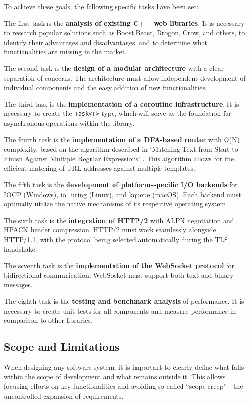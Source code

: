 To achieve these goals, the following specific tasks have been set:

The first task is the \textbf{analysis of existing C++ web libraries}. It is necessary to research popular solutions such as Boost.Beast, Drogon, Crow, and others, to identify their advantages and disadvantages, and to determine what functionalities are missing in the market.

The second task is the \textbf{design of a modular architecture} with a clear separation of concerns. The architecture must allow independent development of individual components and the easy addition of new functionalities.

The third task is the \textbf{implementation of a coroutine infrastructure}. It is necessary to create the \texttt{Task<T>} type, which will serve as the foundation for asynchronous operations within the library.

The fourth task is the \textbf{implementation of a DFA-based router} with O(N) complexity, based on the algorithm described in `Matching Text from Start to Finish Against Multiple Regular Expressions' \cite{stankov2024regex}. This algorithm allows for the efficient matching of URL addresses against multiple templates.

The fifth task is the \textbf{development of platform-specific I/O backends} for IOCP (Windows), io\_uring (Linux), and kqueue (macOS). Each backend must optimally utilize the native mechanisms of its respective operating system.

The sixth task is the \textbf{integration of HTTP/2} with ALPN negotiation and HPACK header compression. HTTP/2 must work seamlessly alongside HTTP/1.1, with the protocol being selected automatically during the TLS handshake.

The seventh task is the \textbf{implementation of the WebSocket protocol} for bidirectional communication. WebSocket must support both text and binary messages.

The eighth task is the \textbf{testing and benchmark analysis} of performance. It is necessary to create unit tests for all components and measure performance in comparison to other libraries.

\subsection{Scope and Limitations}

When designing any software system, it is important to clearly define what falls within the scope of development and what remains outside it. This allows focusing efforts on key functionalities and avoiding so-called ``scope creep''---the uncontrolled expansion of requirements.

